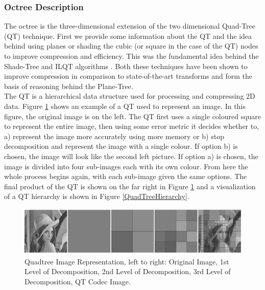 \subsubsection{Octree Description}
\label{OTDesc}

The octree is the three-dimensional extension of the two dimensional Quad-Tree (QT) technique. First we provide some information about the QT and the idea behind using planes or shading the cubic (or square in the case of the QT) nodes to improve compression and efficiency. This was the fundamental idea behind the Shade-Tree and ILQT algorithms \cite{Lincoln13Interpolating,Gonzalez07ShadeTree}. Both these techniques have been shown to improve compression in comparison to state-of-the-art transforms and form the basis of reasoning behind the Plane-Tree. \\

The QT is a hierarchical data structure used for processing and compressing 2D data. Figure \ref{QuadtreeExample} shows an example of a QT used to represent an image. In this figure, the original image is on the left. The QT first uses a single coloured square to represent the entire image, then using some error metric it decides whether to, a) represent the image more accurately using more memory or b) stop decomposition and represent the image with a single colour. If option b) is chosen, the image will look like the second left picture. If option a) is chosen, the image is divided into four sub-images each with its own colour. From here the whole process begins again, with each sub-image given the same options. The final product of the QT is shown on the far right in Figure \ref{QuadtreeExample} and a visualization of a QT hierarchy is shown in Figure \ref{QuadTreeHierarchy}. \\


\begin{figure}[!htb]
\centering
\includegraphics[width=12cm]{images/ch2/quadtreeexample}
\caption{Quadtree Image Representation, left to right: Original Image, 1st Level of Decomposition, 2nd Level of Decomposition, 3rd Level of Decomposition, QT Codec Image.}
\label{QuadtreeExample}
\end{figure}


